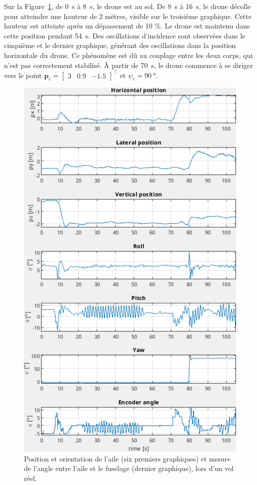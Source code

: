 Sur la Figure~\ref{fig:colibri_flight}, de \SI{0}{\second} à \SI{8}{\second}, le drone est au sol. De \SI{8}{\second} à \SI{16}{\second}, le drone décolle pour atteindre une hauteur de 2 mètres, visible sur le troisième graphique. Cette hauteur est atteinte après un dépassement de 10 \%. Le drone est maintenu dans cette position pendant \SI{54}{\second}. Des oscillations d'incidence sont observées dans le cinquième et le dernier graphique, générant des oscillations dans la position horizontale du drone. Ce phénomène est dû au couplage entre les deux corps, qui n'est pas correctement stabilisé. À partir de \SI{70}{\second}, le drone commence à se diriger vers le point $\boldsymbol{p}_{c} = \begin{bmatrix} 3 & 0.9 & -1.5 \end{bmatrix}^\top$ et $\psi_{c}=\SI{90}{\degree}$.
\begin{figure}[ht!]
\centering
    \includegraphics[width=0.6\columnwidth,angle=0]{figures/colibri_flight.png}
    \caption{Position et orientation de l'aile (six premiers graphiques) et mesure de l'angle entre l'aile et le fuselage (dernier graphique), lors d'un vol réel. }
    \label{fig:colibri_flight}
\end{figure}


